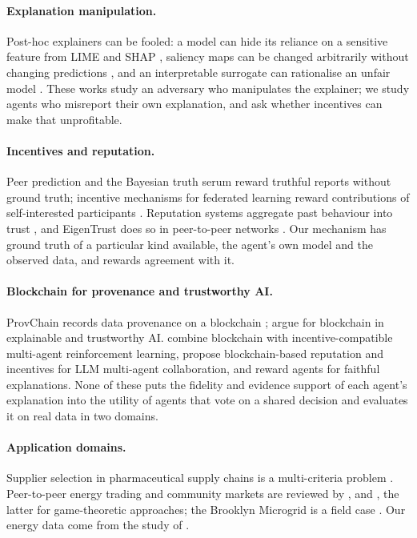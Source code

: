 \documentclass[pdflatex,sn-basic]{sn-jnl}
\begin{document}
\paragraph{Explanation manipulation.} Post-hoc explainers can be fooled: a model can hide its
reliance on a sensitive feature from LIME and SHAP \citep{slack2020}, saliency maps can be
changed arbitrarily without changing predictions \citep{dombrowski2019,heo2019}, and an
interpretable surrogate can rationalise an unfair model \citep{aivodji2019}. These works study
an adversary who manipulates the explainer; we study agents who misreport their own
explanation, and ask whether incentives can make that unprofitable.

\paragraph{Incentives and reputation.} Peer prediction \citep{miller2005} and the Bayesian truth
serum \citep{prelec2004} reward truthful reports without ground truth; incentive mechanisms for
federated learning reward contributions of self-interested participants \citep{zhan2021}.
Reputation systems aggregate past behaviour into trust \citep{josang2007}, and EigenTrust
does so in peer-to-peer networks \citep{kamvar2003}. Our mechanism has ground truth of a
particular kind available, the agent's own model and the observed data, and rewards agreement
with it.

\paragraph{Blockchain for provenance and trustworthy AI.} ProvChain records data provenance on
a blockchain \citep{liang2017}; \citet{nassar2019} argue for blockchain in explainable and
trustworthy AI. \citet{tian2025} combine blockchain with incentive-compatible multi-agent
reinforcement learning, \citet{kumala2026} propose blockchain-based reputation and incentives
for LLM multi-agent collaboration, and \citet{cheng2026} reward agents for faithful
explanations. None of these puts the fidelity and evidence support of each agent's explanation
into the utility of agents that vote on a shared decision and evaluates it on real data in two
domains.

\paragraph{Application domains.} Supplier selection in pharmaceutical supply chains is a
multi-criteria problem \citep{forghani2018}. Peer-to-peer energy trading and community markets
are reviewed by \citet{tushar2020}, \citet{sousa2019} and \citet{tushar2018}, the latter for
game-theoretic approaches; the Brooklyn Microgrid is a field case \citep{mengelkamp2018}. Our
energy data come from the study of \citet{garciamunoz2025}.
\end{document}
